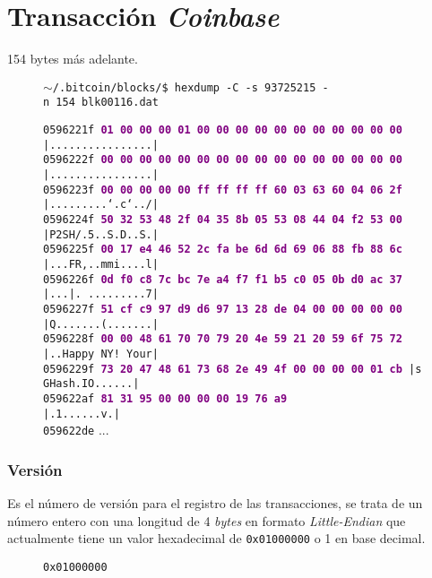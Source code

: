 \documentclass{article}
\begin{document}
\section{Transacción \textit{Coinbase}}
154 bytes más adelante.
\begin{figure}[H]
\scriptsize{\texttt{$\sim$/.bitcoin/blocks/\$ hexdump\ -C\ -s\ 93725215\ -n\ 154\ blk00116.dat}}
    
    \scriptsize{
    \texttt{0596221f  \textbf{\textcolor{purple}{01 00 00 00 01 00 00 00  00 00 00 00 00 00 00 00}}  |................|} \\
    \texttt{0596222f  \textbf{\textcolor{purple}{00 00 00 00 00 00 00 00  00 00 00 00 00 00 00 00}}  |................|} \\
    \texttt{0596223f  \textbf{\textcolor{purple}{00 00 00 00 00 ff ff ff  ff 60 03 63 60 04 06 2f}}  |.........`.c`../|} \\
    \texttt{0596224f  \textbf{\textcolor{purple}{50 32 53 48 2f 04 35 8b  05 53 08 44 04 f2 53 00}}  |P2SH/.5..S.D..S.|} \\
    \texttt{0596225f  \textbf{\textcolor{purple}{00 17 e4 46 52 2c fa be  6d 6d 69 06 88 fb 88 6c}}  |...FR,..mmi....l|} \\
    \texttt{0596226f  \textbf{\textcolor{purple}{0d f0 c8 7c bc 7e a4 f7  f1 b5 c0 05 0b d0 ac 37}}  |...|.~.........7|} \\
    \texttt{0596227f  \textbf{\textcolor{purple}{51 cf c9 97 d9 d6 97 13  28 de 04 00 00 00 00 00}}  |Q.......(.......|} \\
    \texttt{0596228f  \textbf{\textcolor{purple}{00 00 48 61 70 70 79 20  4e 59 21 20 59 6f 75 72}}  |..Happy NY! Your|} \\
    \texttt{0596229f  \textbf{\textcolor{purple}{73 20 47 48 61 73 68 2e  49 4f 00 00 00 00 01 cb}}  |s GHash.IO......|} \\
    \texttt{059622af  \textbf{\textcolor{purple}{81 31 95 00 00 00 00 19  76 a9 \ \ \ \ \ \ \ \ \ \ \ \ \ \ \ \ \ }}  |.1......v.|} \\
    \texttt{059622de} ...}
\end{figure}

    \subsubsection{Versión}
    Es el número de versión para el registro de las transacciones, se trata de un número entero con una longitud de 4 \textit{bytes} en formato \textit{Little-Endian} que actualmente tiene un valor hexadecimal de \texttt{0x01000000} o 1 en base decimal.
    \begin{figure}[H]
        \texttt{0x01000000}
    \end{figure}
    
\end{document}
